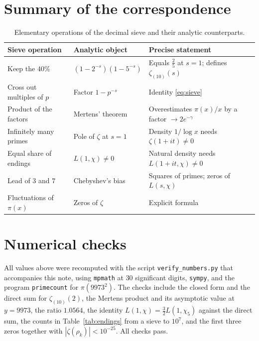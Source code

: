 \documentclass[11pt]{amsart}
\theoremstyle{remark}
\newcommand{\zt}{\zeta_{(10)}}
\begin{document}
\section{Summary of the correspondence}\label{sec:summary}

\begin{table}[ht]
\centering
\small
\caption{Elementary operations of the decimal sieve and their analytic counterparts.}\label{tab:map}
\begin{tabular}{@{}p{3.6cm}p{4.0cm}p{5.4cm}@{}}
\toprule
Sieve operation & Analytic object & Precise statement\\
\midrule
Keep the $40\%$ & $(1-2^{-s})(1-5^{-s})$ & Equals $\tfrac25$ at $s=1$; defines $\zt(s)$\\
Cross out multiples of $p$ & Factor $1-p^{-s}$ & Identity \eqref{eq:sieve}\\
Product of the factors & Mertens' theorem & Overestimates $\pi(x)/x$ by a factor $\to2e^{-\gamma}$\\
Infinitely many primes & Pole of $\zeta$ at $s=1$ & Density $1/\log x$ needs $\zeta(1+it)\ne0$\\
Equal share of endings & $L(1,\chi)\ne0$ & Natural density needs $L(1+it,\chi)\ne0$\\
Lead of $3$ and $7$ & Chebyshev's bias & Squares of primes; zeros of $L(s,\chi)$\\
Fluctuations of $\pi(x)$ & Zeros of $\zeta$ & Explicit formula\\
\bottomrule
\end{tabular}
\end{table}

\section{Numerical checks}\label{sec:checks}

All values above were recomputed with the script \texttt{verify\_numbers.py} that accompanies this note, using \texttt{mpmath} at $30$ significant digits, \texttt{sympy}, and the program \texttt{primecount} \cite{primecount} for $\pi(9973^2)$. The checks include the closed form and the direct sum for $\zt(2)$, the Mertens product and its asymptotic value at $y=9973$, the ratio $1.0564$, the identity $L(1,\chi)=\frac32L(1,\chi_5)$ against the direct sum, the counts in Table~\ref{tab:endings} from a sieve to $10^7$, and the first three zeros together with $|\zeta(\rho_k)|<10^{-25}$. All checks pass.
\end{document}
